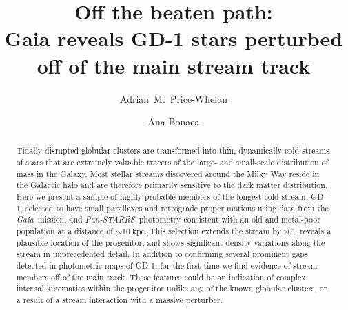 \documentclass[modern]{aastex62}
\newcommand{\gaia}{\textsl{Gaia}}
\newcommand{\pans}{\textsl{Pan-STARRS}}
\newcommand{\kpc}{\textrm{kpc}}
\begin{document}
\sloppy\sloppypar\raggedbottom\frenchspacing %

\title{Off the beaten path: \\
       Gaia reveals GD-1 stars perturbed off of the main stream track}

\author[0000-0003-0872-7098]{Adrian~M.~Price-Whelan}

\author[0000-0002-7846-9787]{Ana Bonaca}

\begin{abstract}\noindent %
Tidally-disrupted globular clusters are transformed into thin, dynamically-cold
streams of stars that are extremely valuable tracers of the large- and
small-scale distribution of mass in the Galaxy.
Most stellar streams discovered around the Milky Way reside in the Galactic halo
and are therefore primarily sensitive to the dark matter distribution.
Here we present a sample of highly-probable members of the longest cold stream, GD-1, selected to have
small parallaxes and retrograde proper motions using data from the \gaia\
mission, and \pans\ photometry consistent with an old and metal-poor population
at a distance of $\sim10~\kpc$.
This selection extends the stream by $20^\circ$, reveals a plausible location of
the progenitor, and shows significant density variations along the stream in
unprecedented detail.
In addition to confirming several prominent gaps detected in photometric maps of
GD-1, for the first time we find evidence of stream members off of the main
track.
These features could be an indication of complex internal kinematics within the
progenitor unlike any of the known globular clusters, or a result of a stream
interaction with a massive perturber.
\end{abstract}
\end{document}
